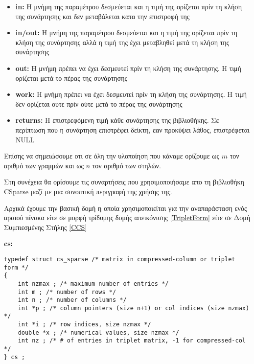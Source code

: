 \begin{itemize}
  \item \textbf{in:}  Η μνήμη της παραμέτρου δεσμεύεται και η τιμή της ορίζεται πρίν τη κλήση της συνάρτησης και δεν μεταβάλεται κατα την επιστροφή της 
  \item \textbf{in/out:}  Η μνήμη της παραμέτρου δεσμεύεται και η τιμή της ορίζεται πρίν τη κλήση της συνάρτησης αλλά η τιμή της έχει μεταβληθεί μετά τη κλήση της συνάρτησης 
  \item \textbf{out:}  Η μνήμη πρέπει να έχει δεσμευτεί πρίν τη κλήση της συνάρτησης. Η τιμή ορίζεται μετά το πέρας της συνάρτησης 
  \item \textbf{work:}   Η μνήμη πρέπει να έχει δεσμευτεί πρίν τη κλήση της συνάρτησης. Η τιμή δεν ορίζεται ουτε πρίν ούτε μετά το πέρας της συνάρτησης  
  \item \textbf{returns:}  Η επιστρεφόμενη τιμή κάθε συνάρτησης της βιβλιοθήκης. Σε περίπτωση που η συνάρτηση επιστρέφει δείκτη, εαν προκύψει λάθος, επιστρέφεται NULL
\end{itemize}

 Επίσης να σημειώσουμε οτι σε όλη την υλοποίηση που κάναμε ορίζουμε ως $m$ τον αριθμό των γραμμών και ως $n$ τον αριθμό των στηλών.

Στη συνέχεια θα ορίσουμε τις συναρτήσεις που χρησιμοποιήσαμε απο τη βιβλιοθήκη CSparse μαζί με μια συνοπτική περιγραφή της χρήσης της.

Αρχικά έχουμε την βασική δομή η οποία χρησιμοποιείται για την αναπαράσταση ενός αραιού πίνακα είτε σε μορφή τρίδυμης δομής απεικόνισης \ref{TripletForm} είτε σε Δομή Συμπιεσμένης Στήλης \ref{CCS}

\textbf{cs:}
\begin{verbatim}
typedef struct cs_sparse /* matrix in compressed-column or triplet form */
{
    int nzmax ; /* maximum number of entries */
    int m ; /* number of rows */
    int n ; /* number of columns */
    int *p ; /* column pointers (size n+1) or col indices (size nzmax) */
    int *i ; /* row indices, size nzmax */
    double *x ; /* numerical values, size nzmax */
    int nz ; /* # of entries in triplet matrix, -1 for compressed-col */
} cs ;
\end{verbatim}

